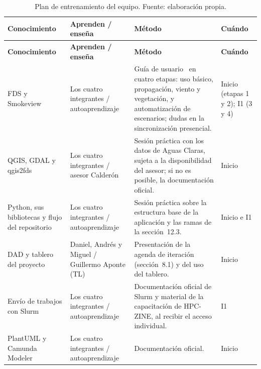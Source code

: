 \begin{longtable}{|p{}|p{}|p{}|p{}|}
\caption{Plan de entrenamiento del equipo. Fuente: elaboración propia.}\label{tab:entrenamiento}\\
\hline
\textbf{Conocimiento} & \textbf{Aprenden / enseña} & \textbf{Método} & \textbf{Cuándo}\tabularnewline\hline
\endfirsthead

\hline
\textbf{Conocimiento} & \textbf{Aprenden / enseña} & \textbf{Método} & \textbf{Cuándo}\tabularnewline\hline
\endhead

\raggedright FDS y Smokeview &
\raggedright Los cuatro integrantes / autoaprendizaje &
\raggedright Guía de usuario~\cite{fdsuserguide} en cuatro etapas: uso básico, propagación, viento y vegetación, y automatización de escenarios; dudas en la sincronización presencial. &
\raggedright Inicio (etapas 1 y 2); I1 (3 y 4)\tabularnewline\hline

\raggedright QGIS, GDAL y qgis2fds &
\raggedright Los cuatro integrantes / asesor Calderón &
\raggedright Sesión práctica con los datos de Aguas Claras, sujeta a la disponibilidad del asesor; si no es posible, la documentación oficial. &
\raggedright Inicio\tabularnewline\hline

\raggedright Python, sus bibliotecas y flujo del repositorio &
\raggedright Los cuatro integrantes / autoaprendizaje &
\raggedright Sesión práctica sobre la estructura base de la aplicación y las ramas de la sección~12.3. &
\raggedright Inicio e I1\tabularnewline\hline

\raggedright DAD y tablero del proyecto &
\raggedright Daniel, Andrés y Miguel / Guillermo Aponte (TL) &
\raggedright Presentación de la agenda de iteración (sección~8.1) y del uso del tablero. &
\raggedright Inicio\tabularnewline\hline

\raggedright Envío de trabajos con Slurm &
\raggedright Los cuatro integrantes / autoaprendizaje &
\raggedright Documentación oficial de Slurm y material de la capacitación de HPC-ZINE, al recibir el acceso individual. &
\raggedright I1\tabularnewline\hline

\raggedright PlantUML y Camunda Modeler &
\raggedright Los cuatro integrantes / autoaprendizaje &
\raggedright Documentación oficial. &
\raggedright Inicio\tabularnewline\hline

\end{longtable}
